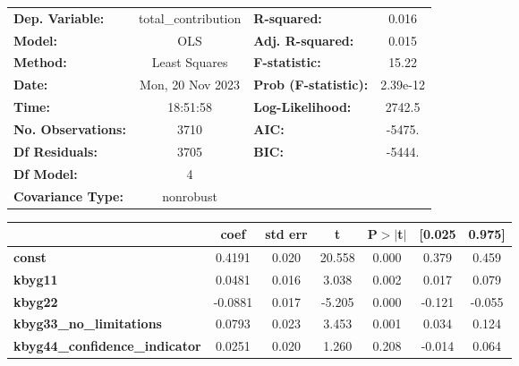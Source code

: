\begin{center}
\begin{tabular}{lclc}
\toprule
\textbf{Dep. Variable:}                & total\_contribution & \textbf{  R-squared:         } &     0.016   \\
\textbf{Model:}                        &         OLS         & \textbf{  Adj. R-squared:    } &     0.015   \\
\textbf{Method:}                       &    Least Squares    & \textbf{  F-statistic:       } &     15.22   \\
\textbf{Date:}                         &   Mon, 20 Nov 2023  & \textbf{  Prob (F-statistic):} &  2.39e-12   \\
\textbf{Time:}                         &       18:51:58      & \textbf{  Log-Likelihood:    } &    2742.5   \\
\textbf{No. Observations:}             &          3710       & \textbf{  AIC:               } &    -5475.   \\
\textbf{Df Residuals:}                 &          3705       & \textbf{  BIC:               } &    -5444.   \\
\textbf{Df Model:}                     &             4       & \textbf{                     } &             \\
\textbf{Covariance Type:}              &      nonrobust      & \textbf{                     } &             \\
\bottomrule
\end{tabular}
\begin{tabular}{lcccccc}
                                       & \textbf{coef} & \textbf{std err} & \textbf{t} & \textbf{P$> |$t$|$} & \textbf{[0.025} & \textbf{0.975]}  \\
\midrule
\textbf{const}                         &       0.4191  &        0.020     &    20.558  &         0.000        &        0.379    &        0.459     \\
\textbf{kbyg11}                        &       0.0481  &        0.016     &     3.038  &         0.002        &        0.017    &        0.079     \\
\textbf{kbyg22}                        &      -0.0881  &        0.017     &    -5.205  &         0.000        &       -0.121    &       -0.055     \\
\textbf{kbyg33\_no\_limitations}       &       0.0793  &        0.023     &     3.453  &         0.001        &        0.034    &        0.124     \\
\textbf{kbyg44\_confidence\_indicator} &       0.0251  &        0.020     &     1.260  &         0.208        &       -0.014    &        0.064     \\

\end{tabular}
\end{center}

